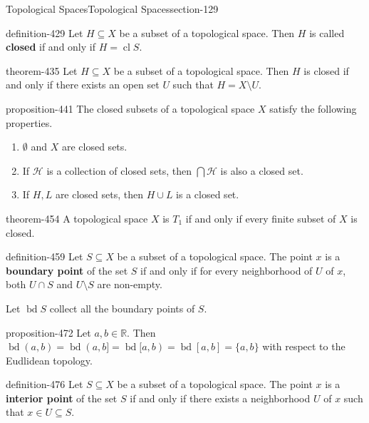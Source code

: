 \documentclass[oneside,10pt,]{article}
\newcommand{\terminology}[1]{\textbf{#1}}
\newcommand{\mb}{\mathbb}
\newcommand{\mc}{\mathcal}
\newcommand{\cl}{\operatorname{cl}}
\newcommand{\bd}{\operatorname{bd}}
\begin{document}
\begin{sectionptx}{Topological Spaces}{}{Topological Spaces}{}{}{section-129}
\begin{definition}{}{definition-429}
Let \(H\subseteq X\) be a subset of a topological space. Then \(H\) is called \terminology{closed} if and only if \(H=\cl S\).%
\end{definition}
\begin{theorem}{}{}{theorem-435}%
\hypertarget{p-436}{}%
Let \(H\subseteq X\) be a subset of a topological space. Then \(H\) is closed if and only if there exists an open set \(U\) such that \(H=X\setminus U\).%
\end{theorem}
\begin{proposition}{}{}{proposition-441}%
\hypertarget{p-442}{}%
The closed subsets of a topological space \(X\) satisfy the following properties.%
\leavevmode%
\begin{enumerate}
\item\hypertarget{li-445}{}\(\emptyset\) and \(X\) are closed sets.%
\item\hypertarget{li-448}{}If \(\mc H\) is a collection of closed sets, then \(\bigcap\mc H\) is also a closed set.%
\item\hypertarget{li-451}{}If \(H,L\) are closed sets, then \(H\cup L\) is a closed set.%
\end{enumerate}
\end{proposition}
\begin{theorem}{}{}{theorem-454}%
\hypertarget{p-455}{}%
A topological space \(X\) is \(T_1\) if and only if every finite subset of \(X\) is closed.%
\end{theorem}
\begin{definition}{}{definition-459}%
\hypertarget{p-460}{}%
Let \(S\subseteq X\) be a subset of a topological space. The point \(x\) is a \terminology{boundary point} of the set \(S\) if and only if for every neighborhood of \(U\) of \(x\), both \(U\cap S\) and \(U\setminus S\) are non-empty.%
\par
\hypertarget{p-469}{}%
Let \(\bd S\) collect all the boundary points of \(S\).%
\end{definition}
\begin{proposition}{}{}{proposition-472}%
\hypertarget{p-473}{}%
Let \(a,b\in\mb R\). Then \(\bd (a,b)=\bd (a,b]=\bd [a,b)=\bd [a,b]=\{a,b\}\) with respect to the Eudlidean topology.%
\end{proposition}
\begin{definition}{}{definition-476}%
\hypertarget{p-477}{}%
Let \(S\subseteq X\) be a subset of a topological space. The point \(x\) is a \terminology{interior point} of the set \(S\) if and only if there exists a neighborhood \(U\) of \(x\) such that \(x\in U\subseteq S\).%

\end{definition}
\end{sectionptx}
\end{document}
